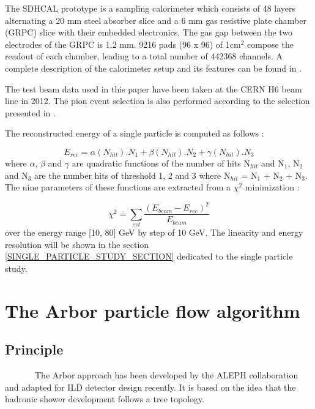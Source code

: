 \documentclass[cits]{JINST}
\begin{document}
The SDHCAL prototype is a sampling calorimeter which consists of 48 layers alternating a 20 mm steel absorber slice and a 6 mm gas resistive plate chamber (GRPC) slice with their embedded electronics. The gas gap between the two electrodes of the GRPC is 1.2 mm. 9216 pads (96 x 96) of 1cm$^2$ compose the readout of each chamber, leading to a total number of 442368 channels. A complete description of the calorimeter setup and its features can be found in \cite{sdhcal-paper}. 

The test beam data used in this paper have been taken at the CERN H6 beam line in 2012. The pion event selection is also performed according to the selection presented in \cite{sdhcal-paper}.

The reconstructed energy of a single particle is computed as follows :

\begin{equation}
  E_{rec} = \alpha(N_{hit}).N_{1}
          + \beta(N_{hit}) .N_{2}
          + \gamma(N_{hit}).N_{3}   
\end{equation}
where $\alpha$, $\beta$ and $\gamma$ are quadratic functions of the number of hits N$_{hit}$ and N$_1$, N$_2$ and N$_3$ are the number hits of threshold 1, 2 and 3 where N$_{hit}$ = N$_1$ + N$_2$ + N$_3$. The nine parameters of these functions are extracted from a $\chi^2$ minimization :

\begin{equation}
  \chi^2 = \sum\limits_{evt} \frac{(E_{beam} - E_{rec})^2}{E_{beam}}
\end{equation}
over the energy range [10, 80] GeV by step of 10 GeV. The linearity and energy resolution will be shown in the section \ref{SINGLE_PARTICLE_STUDY_SECTION} dedicated to the single particle study.

\newpage
\section{The Arbor particle flow algorithm}

\subsection{Principle} 

~~~~~~~The Arbor approach has been developed by the ALEPH collaboration and adapted \cite{arbor-manqi} for ILD detector design recently. It is based on the idea that the hadronic shower development follows a tree topology.
\end{document}

